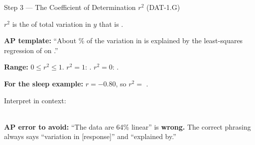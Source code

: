 \documentclass[10pt]{article}
\begin{document}
\vspace{0.1in}

\begin{notesbox}{Step 3 --- The Coefficient of Determination $r^2$ (DAT-1.G)}
\small

\noindent $r^2$ is the  of total variation in $y$ that is .

\vspace{6pt}
\textbf{AP template:} ``About \ans{[value]}\% of the variation in
 is explained by the least-squares regression of
\ans{[response]} on .''

\vspace{8pt}
\textbf{Range:} $0 \leq r^2 \leq 1$.
\quad $r^2 = 1$: . \quad $r^2 = 0$: .

\vspace{8pt}
\textbf{For the sleep example:} $r = -0.80$, so $r^2 = $ .

\vspace{4pt}
Interpret in context:\\[6pt]
\\[2pt]

\vspace{6pt}
\begin{tcolorbox}[colback=redbg, colframe=redacc, boxrule=0.8pt, arc=2mm,
    left=3mm, right=3mm, top=2mm, bottom=2mm]
\small\textbf{AP error to avoid:} ``The data are 64\% linear'' is \textbf{wrong.}
The correct phrasing always says ``variation in [response]'' and ``explained by.''
\end{tcolorbox}

\end{notesbox}

\vspace{0.1in}
\end{document}
